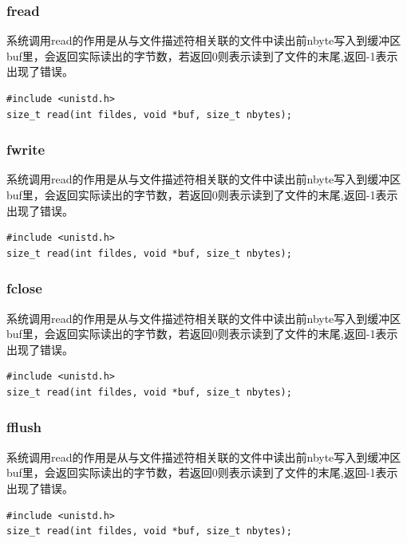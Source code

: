 \documentclass{beamer}
\begin{document}
\begin{frame}[fragile]
\frametitle{fread}
系统调用read的作用是从与文件描述符相关联的文件中读出前nbyte写入到缓冲区buf里，会返回实际读出的字节数，若返回0则表示读到了文件的末尾,返回-1表示出现了错误。
\begin{example}[read系统调用的原型]
\begin{verbatim}
#include <unistd.h>
size_t read(int fildes, void *buf, size_t nbytes);
\end{verbatim}
\end{example}

\end{frame}

\begin{frame}[fragile]
\frametitle{fwrite}
系统调用read的作用是从与文件描述符相关联的文件中读出前nbyte写入到缓冲区buf里，会返回实际读出的字节数，若返回0则表示读到了文件的末尾,返回-1表示出现了错误。
\begin{example}[read系统调用的原型]
\begin{verbatim}
#include <unistd.h>
size_t read(int fildes, void *buf, size_t nbytes);
\end{verbatim}
\end{example}

\end{frame}
\begin{frame}[fragile]
\frametitle{fclose}
系统调用read的作用是从与文件描述符相关联的文件中读出前nbyte写入到缓冲区buf里，会返回实际读出的字节数，若返回0则表示读到了文件的末尾,返回-1表示出现了错误。
\begin{example}[read系统调用的原型]
\begin{verbatim}
#include <unistd.h>
size_t read(int fildes, void *buf, size_t nbytes);
\end{verbatim}
\end{example}

\end{frame}
\begin{frame}[fragile]
\frametitle{fflush}
系统调用read的作用是从与文件描述符相关联的文件中读出前nbyte写入到缓冲区buf里，会返回实际读出的字节数，若返回0则表示读到了文件的末尾,返回-1表示出现了错误。
\begin{example}[read系统调用的原型]
\begin{verbatim}
#include <unistd.h>
size_t read(int fildes, void *buf, size_t nbytes);
\end{verbatim}
\end{example}

\end{frame}
\end{document}
